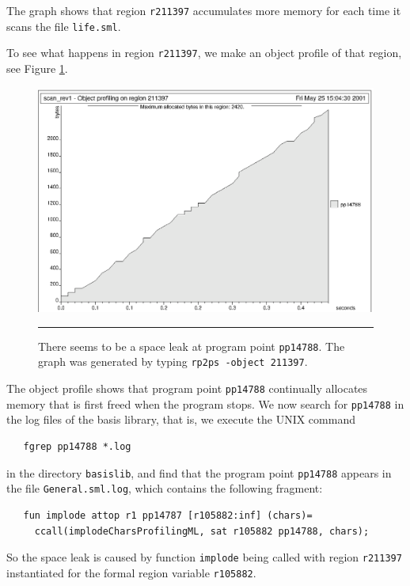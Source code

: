 \documentclass[12pt]{book}
\begin{document}
The graph shows that region \texttt{r211397} accumulates more memory
for each time it scans the file {\tt life.sml}.

To see what happens in region \texttt{r211397}, we make an object profile of
that region, see Figure \ref{scan_rev1_2.fig}.
\begin{figure}
\begin{center}
  \includegraphics{scan_rev1_2.ps}
\end{center}
\caption{There seems to be a space leak at program point
  \texttt{pp14788}. The graph was generated by typing \texttt{rp2ps
    -object 211397}.}
\label{scan_rev1_2.fig}
\medskip\hrule
\end{figure}
The object profile shows that program point \texttt{pp14788}
continually allocates memory that is first freed when the program
stops. We now search for \texttt{pp14788} in the log files of the basis
library, that is, we execute the UNIX command
\begin{verbatim}
   fgrep pp14788 *.log
\end{verbatim}
in the directory {\tt basislib}, and find that the program point {\tt pp14788}
appears in the file {\tt General.sml.log}, which contains the following
fragment:
\begin{verbatim}
   fun implode attop r1 pp14787 [r105882:inf] (chars)= 
     ccall(implodeCharsProfilingML, sat r105882 pp14788, chars); 
\end{verbatim}
So the space leak is caused by function {\tt implode} being called
with region {\tt r211397} instantiated for the formal region variable
{\tt r105882}.
\end{document}

